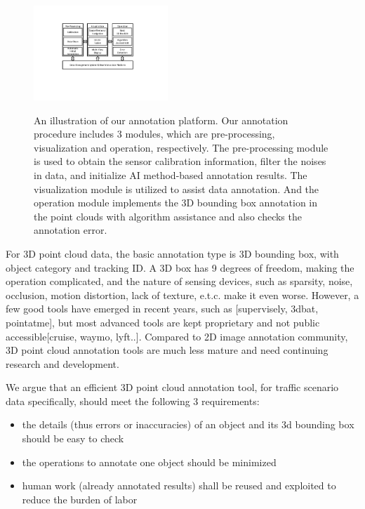 \documentclass[letterpaper, 10 pt, conference]{ieeeconf}  %
\begin{document}
\begin{figure}[htbp]
	\centering
	\includegraphics[width=0.45\textwidth]{./figures/arch}\\ %
	\caption{An illustration of our annotation platform. Our annotation procedure includes 3 modules, which are pre-processing, visualization and operation, respectively. The pre-processing module is used to obtain the sensor calibration information, filter the noises in data, and initialize AI method-based annotation results. The visualization module is utilized to assist data annotation. And the operation module implements the 3D bounding box annotation in the point clouds with algorithm assistance and also checks the annotation error.}
	\label{fig:arch}
	\vspace{-0.3cm}
\end{figure}




For 3D point cloud data, the basic annotation type is 3D bounding box, with object category and tracking ID. A 3D box has 9 degrees of freedom, making the operation complicated, and the nature of sensing devices, such as sparsity, noise, occlusion, motion distortion, lack of texture, e.t.c. make it even worse.
However, a few good tools have emerged in recent years, such as [supervisely, 3dbat, pointatme], but most advanced tools are kept proprietary and not public accessible[cruise, waymo, lyft..]. Compared to 2D image annotation community, 3D point cloud annotation tools are much less mature and need continuing research and development.

We argue that an efficient 3D point cloud annotation tool, for traffic scenario data specifically,  should meet the following 3 requirements:

\begin{itemize}
	\item the details (thus errors or inaccuracies) of an object and its 3d bounding box should be easy to check
	\item the operations to annotate one object should be minimized
	\item human work (already annotated results) shall be reused and exploited to reduce the burden of labor
\end{itemize}
\end{document}
